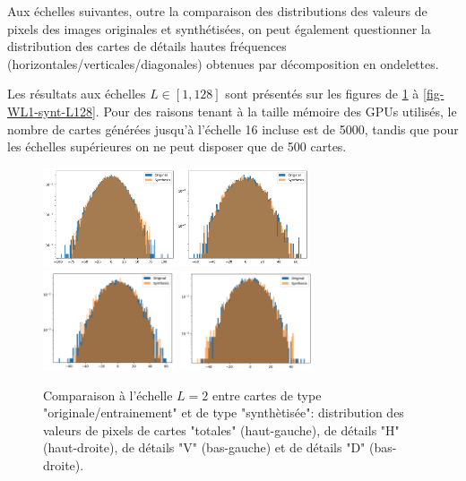 \documentclass[12pt,twoside]{article}
\begin{document}
Aux échelles suivantes, outre la comparaison des distributions des valeurs de pixels des images originales et synthétisées, on peut également questionner la distribution des cartes de détails hautes fréquences (horizontales/verticales/diagonales) obtenues par décomposition en ondelettes.

Les résultats aux échelles $L\in[1,128]$ sont présentés sur les figures de \ref{fig-WL1-synt-L2} à \ref{fig-WL1-synt-L128}. Pour des raisons tenant à la taille mémoire des GPUs utilisés, le nombre de cartes générées jusqu'à l'échelle 16 incluse est de 5000, tandis que pour les échelles supérieures on ne peut disposer que de 500 cartes.
\begin{figure}
\centering
\includegraphics[width=0.35\textwidth]{fig-WL1-synt-L2-pixelval.png}\includegraphics[width=0.35\textwidth]{fig-WL1-synt-L2-details_1.png}\\
\includegraphics[width=0.35\textwidth]{fig-WL1-synt-L2-details_2.png}
\includegraphics[width=0.35\textwidth]{fig-WL1-synt-L2-details_3.png}
\caption{Comparaison à l'échelle $L=2$ entre cartes de type "originale/entrainement" et de type "synthètisée": distribution des valeurs de pixels de cartes "totales" (haut-gauche), de détails "H" (haut-droite), de détails "V" (bas-gauche) et de détails "D" (bas-droite). }
\label{fig-WL1-synt-L2}
\end{figure}
\end{document}
